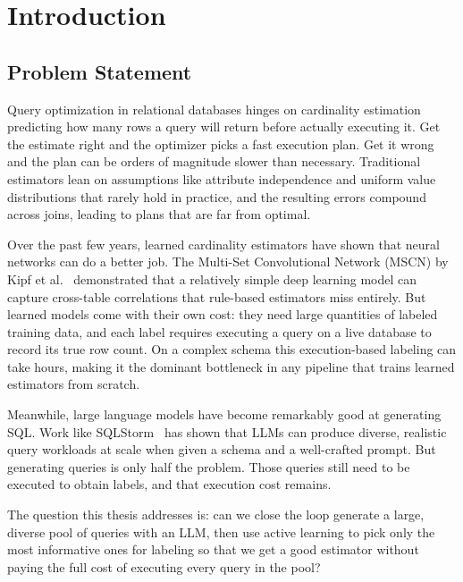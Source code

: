
\chapter{Introduction}
\label{chap:introduction}
\pagestyle{plain}
\setcounter{page}{1}

\section{Problem Statement}

Query optimization in relational databases hinges on cardinality estimation predicting how many rows a query will return before actually executing it. Get the estimate right and the optimizer picks a fast execution plan. Get it wrong and the plan can be orders of magnitude slower than necessary. Traditional estimators lean on assumptions like attribute independence and uniform value distributions that rarely hold in practice, and the resulting errors compound across joins, leading to plans that are far from optimal.

Over the past few years, learned cardinality estimators have shown that neural networks can do a better job. The Multi-Set Convolutional Network (MSCN) by Kipf et al.~\cite{DBLP:conf/cidr/KipfKRLBK19} demonstrated that a relatively simple deep learning model can capture cross-table correlations that rule-based estimators miss entirely. But learned models come with their own cost: they need large quantities of labeled training data, and each label requires executing a query on a live database to record its true row count. On a complex schema this execution-based labeling can take hours, making it the dominant bottleneck in any pipeline that trains learned estimators from scratch.

Meanwhile, large language models have become remarkably good at generating SQL. Work like SQLStorm~\cite{DBLP:journals/pvldb/SchmidtLBN25} has shown that LLMs can produce diverse, realistic query workloads at scale when given a schema and a well-crafted prompt. But generating queries is only half the problem. Those queries still need to be executed to obtain labels, and that execution cost remains.

The question this thesis addresses is: can we close the loop generate a large, diverse pool of queries with an LLM, then use active learning to pick only the most informative ones for labeling so that we get a good estimator without paying the full cost of executing every query in the pool?

